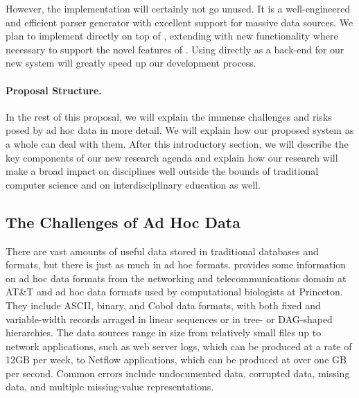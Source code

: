 \documentclass[11pt]{article}
\begin{document}
However, the \pads{} implementation will certainly not go unused.  It is a well-engineered
and efficient parser generator with excellent support for massive data sources.
We plan to implement \datatype{} directly on top of \pads{}, extending \pads{}
with new functionality where necessary to support the novel features of \datatype.  Using \pads{} directly as a back-end for our
new system will greatly speed up our development process.

\paragraph*{Proposal Structure.}
In the rest of this proposal, we will explain the immense
challenges and risks posed by ad hoc data in more detail.  We will
explain how our proposed system as a whole can deal with them.   
After this introductory section, we will describe the
key components of our new research agenda and explain how our research
will make a broad impact on disciplines well outside the bounds of
traditional computer science and on interdisciplinary education as well.

\subsection{The Challenges of Ad Hoc Data}

There are vast amounts of useful data stored in traditional databases
and \xml{} formats, but there is just as much in ad hoc formats.
 provides some information on ad hoc data
formats from the networking and telecommunications domain at AT\&T and
ad hoc data formats used by computational biologists at Princeton.
They include ASCII, binary, and Cobol data formats, with both fixed
and variable-width records arraged in linear sequences or in tree- or
DAG-shaped hierarchies.  The data sources range in size from
relatively small files up to network applications, such as web server
logs, which can be produced at a rate of 12GB per week, to Netflow
applications, which can be produced at over one GB per second.  Common
errors include undocumented data, corrupted data, missing data, and
multiple missing-value representations.
\end{document}
